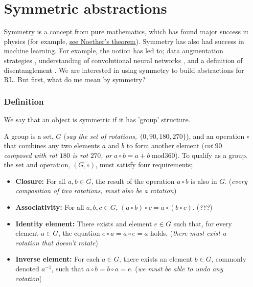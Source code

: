 \newpage
\section{Symmetric abstractions}\label{symmetric-abstractions}

Symmetry is a concept from pure mathematics, which has found major success in physics (for example, \href{https://en.wikipedia.org/wiki/Noether%27s_theorem}{see Noether's theorem}).
Symmetry has also had success in machine learning. For example, the notion has led to;
data augmentation strategies \cite{Simard2003},
understanding of convolutional neural networks \cite{Cohen2017}, and a definition of disentanglement \cite{Higgins2018}.
We are interested in using symmetry to build abstractions for RL. But first, what do me mean by symmetry?




\subsubsection{Definition}

We say that an object is symmetric if it has 'group' structure.

A group is a set, $G$ (\textit{say the set of rotations, $\{0, 90, 180, 270\}$}),
and an operation $\circ$ that combines any two elements $a$ and $b$ to form
another element (\textit{rot $90$ composed with rot $180$ is rot $270$, or} $a \circ b = a + b \;\text{mod} 360$).
To qualify as a group, the set and operation, $(G, \circ)$, must satisfy four requirements;

\begin{itemize}
	\tightlist
	\item \textbf{Closure:} For all $a, b \in G$, the result of the operation $a \circ b$ is also in $G$. (\textit{every composition of two rotations, must also be a rotation})
	\item \textbf{Associativity:} For all $a,b,c \in G$, $(a\circ b) \circ c = a\circ (b\circ c)$. (\textit{???})
	\item \textbf{Identity element:} There exists and element $e\in G$ such that, for every element $a\in G$, the equation $e\circ a = a\circ e = a$ holds. (\textit{there must exist a rotation that doesn't rotate})
	\item \textbf{Inverse element:} For each $a \in G$, there exists an element $b \in G$, commonly denoted $a^{−1}$, such that $a \circ b = b \circ a = e$. (\textit{we must be able to undo any rotation})
\end{itemize}

